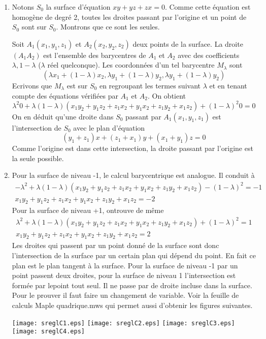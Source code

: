 \begin{enumerate}
\item Notons $S_{0}$ la surface d'équation $xy+yz+zx=0$. Comme cette équation est homogène de degré 2, toutes les droites passant par l'origine et un point de $S_{0}$ sont sur $S_{0}$. Montrons que ce sont les seules.

Soit $A_{1}(x_{1},y_{1},z_{1})$ et $A_{2}(x_{2},y_{2},z_{2})$ deux points de la surface. La droite $(A_{1}A_{2})$ est l'ensemble des barycentres de $A_{1}$ et $A_{2}$ avec des coefficients $\lambda,1-\lambda$ ($\lambda$ réel quelconque). Les coordonnées d'un tel barycentre $M_{\lambda}$ sont
\[(\lambda x_{1}+(1-\lambda)x_{2},\lambda y_{1}+(1-\lambda)y_{2},\lambda y_{1}+(1-\lambda)y_{2})\]
Ecrivons que $ M_{\lambda}$ est sur $S_{0}$ en regroupant les termes suivant $\lambda$ et en tenant compte des équations vérifiées par $A_{1}$ et $A_{2}$. On obtient
\[\lambda^{2}0+\lambda(1-\lambda)(x_{1}y_{2}+y_{1}z_{2}+z_{1}x_{2}+ y_{1}x_{2}+z_{1}y_{2}+x_{1}z_{2})+(1-\lambda)^{2}0=0\]
On en déduit qu'une droite dans $S_{0}$ passant par $A_{1}(x_{1},y_{1},z_{1})$ est l'intersection de $S_{0}$ avec le plan d'équation
\[(y_{1}+z_{1})x+(z_{1}+x_{1})y+(x_{1}+y_{1})z=0\]
Comme l'origine est dans cette intersection, la droite passant par l'origine est la seule possible.
\item Pour la surface de niveau -1, le calcul barycentrique est analogue. Il conduit à
\begin{eqnarray*}
-\lambda^{2}+\lambda(1-\lambda)(x_{1}y_{2}+y_{1}z_{2}+z_{1}x_{2}+ y_{1}x_{2}+z_{1}y_{2}+x_{1}z_{2})-(1-\lambda)^{2}=-1\\
x_{1}y_{2}+y_{1}z_{2}+z_{1}x_{2}+ y_{1}x_{2}+z_{1}y_{2}+x_{1}z_{2}=-2
\end{eqnarray*}
Pour la surface de niveau +1, ontrouve de même
\begin{eqnarray*}
\lambda^{2}+\lambda(1-\lambda)(x_{1}y_{2}+y_{1}z_{2}+z_{1}x_{2}+ y_{1}x_{2}+z_{1}y_{2}+x_{1}z_{2})+(1-\lambda)^{2}=1\\
x_{1}y_{2}+y_{1}z_{2}+z_{1}x_{2}+ y_{1}x_{2}+z_{1}y_{2}+x_{1}z_{2}=2
\end{eqnarray*}
Les droites qui passent par un point donné de la surface sont donc l'intersection de la surface par un certain plan qui dépend du point. En fait ce plan est le plan tangent à la surface. Pour la surface de niveau -1 par un point passent deux droites, pour la surface de niveau 1 l'intersection est formée par lepoint tout seul. Il ne passe par de droite incluse dans la surface. Pour le prouver il faut faire un changement de variable. Voir la feuille de calculs Maple quadrique.mws qui permet aussi d'obtenir les figures suivantes.
\begin{center}
\texttt{[image: sreglC1.eps]}
\hfill
\texttt{[image: sreglC2.eps]}
\texttt{[image: sreglC3.eps]}
\hfill
\texttt{[image: sreglC4.eps]}
\end{center}
\end{enumerate}

